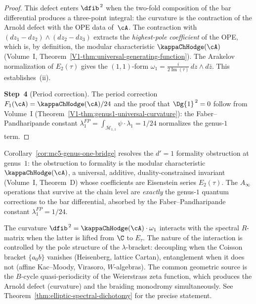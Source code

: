 \begin{proof}
This defect enters $\dfib^{\,2}$ when the two-fold composition of
the bar differential produces a three-point integral: the curvature
is the contraction of the Arnold defect with the OPE data of~$\cA$.
The contraction with $(dz_1 - dz_2) \wedge (dz_2 - dz_3)$ extracts
the \emph{highest-pole coefficient} of the OPE, which is, by
definition, the modular characteristic $\kappaChHodge(\cA)$
(Volume~I, Theorem~\ref*{V1-thm:universal-generating-function}).
The Arakelov normalization of $E_2(\tau)$ gives the $(1,1)$-form
$\omega_1 = \frac{i}{2\operatorname{Im}(\tau)}\,dz \wedge d\bar{z}$.
This establishes~(ii).

\textbf{Step~4} (Period correction).
The period correction $F_1(\cA) = \kappaChHodge(\cA)/24$ and the proof
that $\Dg{1}^{\,2} = 0$ follow from Volume~I
(Theorem~\ref*{V1-thm:genus1-universal-curvature}): the
Faber--Pandharipande constant
$\lambda_1^{FP} = \int_{\overline{\mathcal{M}}_{1,1}} \psi \cdot
\lambda_1 = 1/24$ normalizes the genus-$1$ term.
\end{proof}

\begin{remark}
Corollary~\ref{cor:mc5-genus-one-bridge} resolves the $d' = 1$
formality obstruction at genus~$1$: the obstruction to
formality is the modular
characteristic $\kappaChHodge(\cA)$, a universal, additive,
duality-constrained invariant (Volume~I, Theorem~D) whose
coefficients are Eisenstein series $E_2(\tau)$.
The $A_\infty$ operations that survive at the chain level are
\emph{exactly} the genus-$1$ quantum corrections to the bar
differential, absorbed by the Faber--Pandharipande constant
$\lambda_1^{FP} = 1/24$.
\end{remark}

\begin{remark}
The curvature $\dfib^{\,2} = \kappaChHodge(\cA)\cdot\omega_1$ interacts
with the spectral $R$-matrix when the latter is lifted from
$\C$ to $E_\tau$. The nature of the interaction is controlled by
the pole structure of the $\lambda$-bracket: decoupling when the
Coisson bracket $\{a{}_0 b\}$ vanishes (Heisenberg, lattice
Cartan), entanglement when it does not (affine Kac--Moody,
Virasoro, $W$-algebras). The common geometric source is the
$B$-cycle quasi-periodicity of the Weierstrass zeta function, which
produces the Arnold defect (curvature) and the braiding monodromy
simultaneously.
See Theorem~\ref{thm:elliptic-spectral-dichotomy} for the precise
statement.
\end{remark}

